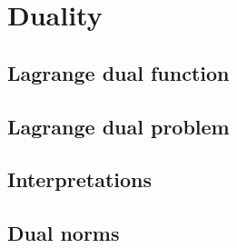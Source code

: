 \chapter{Duality}
\label{chap:duality_general}

\section{Lagrange dual function}
\label{sec:lagrange_dual_function}

\section{Lagrange dual problem}
\label{sec:lagrange_dual_problem}

\section{Interpretations}
\label{sec:duality_interpretations}

\section{Dual norms}
\label{sec:dual_norms}



